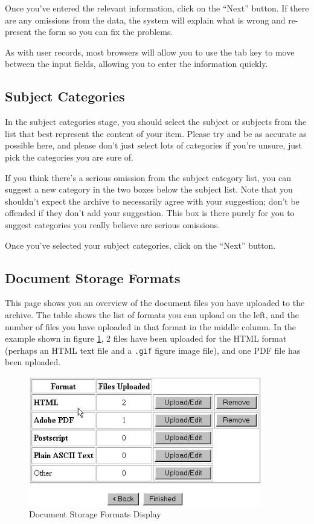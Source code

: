Once you've entered the relevant information, click on the ``Next'' button. If there are any omissions from the data, the system will explain what is wrong and re-present the form so you can fix the problems.

As with user records, most browsers will allow you to use the tab key to move between the input fields, allowing you to enter the information quickly.


\subsection{Subject Categories}

In the subject categories stage, you should select the subject or subjects from the list that best represent the content of your item. Please try and be as accurate as possible here, and please don't just select lots of categories if you're unsure, just pick the categories you are sure of.

If you think there's a serious omission from the subject category list, you can suggest a new category in the two boxes below the subject list. Note that you shouldn't expect the archive to necessarily agree with your suggestion; don't be offended if they don't add your suggestion. This box is there purely for you to suggest categories you really believe are serious omissions.

Once you've selected your subject categories, click on the ``Next'' button.


\subsection{Document Storage Formats}

This page shows you an overview of the document files you have uploaded to the archive. The table shows the list of formats you can upload on the left, and the number of files you have uploaded in that format in the middle column. In the example shown in figure \ref{storage_formats}, 2 files have been uploaded for the HTML format (perhaps an HTML text file and a {\tt .gif} figure image file), and one PDF file has been uploaded.

\begin{figure}
\centerline{\includegraphics[width=4.0in]{images/storage-formats}}
\caption{\label{storage_formats} Document Storage Formats Display}
\end{figure}

